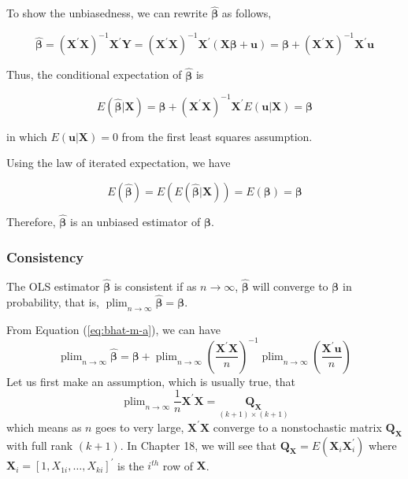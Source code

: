 \documentclass[a4paper,11pt]{article}
\DeclareMathOperator*{\plim}{plim}
\begin{document}
To show the unbiasedness, we can rewrite \(\hat{\boldsymbol{\beta}}\) as
follows,
\begin{LaTeX}
\begin{equation}
\label{eq:bhat-m-a}
\hat{\boldsymbol{\beta}} = \left(\mathbf{X}^{\prime} \mathbf{X}\right)^{-1} \mathbf{X}^{\prime} \mathbf{Y}
= \left(\mathbf{X}^{\prime} \mathbf{X} \right)^{-1} \mathbf{X}^{\prime} (\mathbf{X} \boldsymbol{\beta} + \mathbf{u})
= \boldsymbol{\beta} + \left(\mathbf{X}^{\prime} \mathbf{X}\right)^{-1} \mathbf{X}^{\prime} \mathbf{u}
\end{equation}
\end{LaTeX}

Thus, the conditional expectation of \(\hat{\boldsymbol{\beta}}\) is
\begin{LaTeX}
\begin{equation}
\label{eq:bhat-unbias}
E(\hat{\boldsymbol{\beta}} | \mathbf{X}) = \boldsymbol{\beta} + \left(\mathbf{X}^{\prime} \mathbf{X}\right)^{-1} \mathbf{X}^{\prime} E(\mathbf{u} | \mathbf{X}) = \boldsymbol{\beta}
\end{equation}
\end{LaTeX}
in which \(E(\mathbf{u} | \mathbf{X}) = 0\) from the first least squares
assumption.

Using the law of iterated expectation, we have
\begin{LaTeX}
\[ E(\hat{\boldsymbol{\beta}}) = E(E(\hat{\boldsymbol{\beta}} |
\mathbf{X})) = E(\boldsymbol{\beta}) = \boldsymbol{\beta} \]
\end{LaTeX}
Therefore, \(\hat{\boldsymbol{\beta}}\) is an unbiased estimator of
\(\boldsymbol{\beta}\).

\subsubsection*{Consistency}
\label{sec:org93a2086}
The OLS estimator \(\hat{\boldsymbol{\beta}}\) is consistent if as \(n
\rightarrow \infty\), \(\hat{\boldsymbol{\beta}}\) will converge to
\(\boldsymbol{\beta}\) in probability, that is, \(\plim_{n \rightarrow
\infty} \hat{\boldsymbol{\beta}} = \boldsymbol{\beta}\).

From Equation (\ref{eq:bhat-m-a}), we can have
\begin{equation*}
\plim_{n \rightarrow \infty} \hat{\boldsymbol{\beta}} = \boldsymbol{\beta} + \plim_{n \rightarrow \infty} \left(\frac{\mathbf{X}^{\prime} \mathbf{X}}{n} \right)^{-1} \plim_{n \rightarrow \infty}\left( \frac{\mathbf{X}^{\prime} \mathbf{u}}{n} \right)
\end{equation*}
Let us first  make an assumption, which is usually true, that
\begin{equation}
\label{eq:plim-bhat-m}
 \plim_{n \rightarrow \infty} \frac{1}{n} \mathbf{X}^{\prime}
\mathbf{X} = \underset{(k+1) \times (k+1)}{\mathbf{Q_X}}
\end{equation}
which means as \(n\) goes to very large, \(\mathbf{X}^{\prime}
\mathbf{X}\) converge to a nonstochastic matrix \(\mathbf{Q_X}\) with
full rank \((k + 1)\). In Chapter 18, we will see that \(\mathbf{Q_X} =
E(\mathbf{X}_i \mathbf{X}_i^{\prime})\) where \(\mathbf{X}_i = [1,
X_{1i}, \ldots, X_{ki}]^{\prime}\) is the \(i^{th}\) row of
\(\mathbf{X}\).
\end{document}
